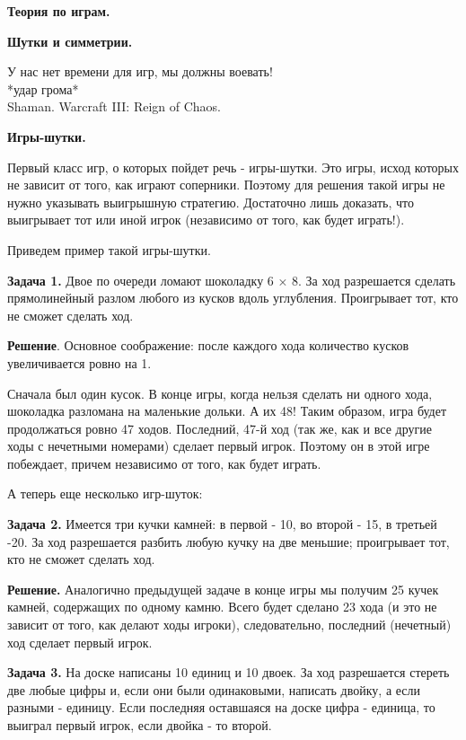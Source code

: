 \hspace{3mm}

\centerline{\bf \Huge Теория по играм.}

\centerline{\bf \Huge Шутки и симметрии.}

\begin{flushright}
    \scriptsize{У нас нет времени для игр, мы должны воевать!\\ *удар грома*\\Shaman. Warcraft III: Reign of Chaos.}
\end{flushright}

\textbf{\Large Игры-шутки.}

Первый класс игр, о которых пойдет речь - игры-шутки. Это игры, исход которых не зависит от того, как играют соперники. Поэтому для решения такой игры не нужно указывать выигрышную стратегию. Достаточно лишь доказать, что выигрывает тот или иной игрок (независимо от того, как будет играть!). 

Приведем пример такой игры-шутки.

\textbf{Задача 1.} Двое по очереди ломают шоколадку 6 × 8. За ход разрешается сделать прямолинейный разлом любого из кусков вдоль углубления. Проигрывает тот, кто не    сможет сделать ход.

\textbf{Решение}. Основное соображение: после каждого хода количество кусков увеличивается ровно на 1. 

Сначала был один кусок. В конце игры, когда нельзя сделать ни одного хода, шоколадка разломана на маленькие дольки. А их 48! Таким образом, игра будет продолжаться ровно 47 ходов. Последний, 47-й ход (так же, как и все другие ходы с нечетными номерами) сделает первый игрок. Поэтому он в этой игре побеждает, причем независимо от того, как будет играть.

А теперь еще несколько игр-шуток:

\textbf{Задача 2.} Имеется три кучки камней: в первой - 10, во второй - 15, в третьей -20. За ход разрешается разбить любую кучку на две меньшие; проигрывает тот, кто не сможет сделать ход.

\textbf{Решение.}
Аналогично предыдущей задаче в конце игры мы получим 25 кучек камней, содержащих по одному камню. Всего будет сделано 23 хода (и это не зависит от того, как делают ходы игроки), следовательно, последний (нечетный) ход сделает первый игрок.


\textbf{Задача 3.} На доске написаны 10 единиц и 10 двоек. За ход разрешается стереть две любые цифры и, если они были одинаковыми, написать двойку, а если разными - единицу. Если последняя оставшаяся на доске цифра - единица, то выиграл первый игрок, если двойка - то второй.


